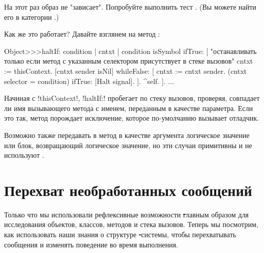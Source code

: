 \documentclass[a4paper,10pt,twoside]{book}
\begin{document}
{%
На этот раз образ не "зависает". Попробуйте выполнить тест .
(Вы можете найти его в категории .)

Как же это работает? Давайте взглянем на метод :
\begin{code}{}
Object>>>haltIf: condition
	| cntxt |
	condition isSymbol ifTrue: [
		"останавливать только если метод с указанным селектором присутствует в стеке вызовов"
		cntxt := thisContext.
		[cntxt sender isNil] whileFalse: [
			cntxt := cntxt sender. 
			(cntxt selector = condition) ifTrue: [Halt signal]. ].
		^self.
	].
	...
\end{code}

Начиная с \ct!thisContext!, \ct!haltIf:! пробегает по стеку вызовов, проверяя, совпадает ли имя вызывающего метода с именем, переданным в качестве параметра. 
Если это так, метод порождает исключение, которое по-умолчанию вызывает отладчик.

Возможно также передавать в метод  в качестве аргумента логическое значение или блок, возвращающий логическое значение, но эти случаи примитивны и не используют .

\section{Перехват необработанных сообщений}

Только что мы использовали рефлексивные возможности \st главным образом для исследования объектов, классов, методов и стека вызовов. Теперь мы посмотрим, как использовать наши знания о структуре \st-системы, чтобы перехватывать сообщения и изменять поведение во время выполнения.

}
\end{document}
